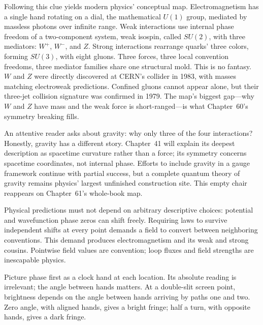 \begin{mainline}
Following this clue yields modern physics' conceptual map. Electromagnetism has a single hand rotating on a dial, the mathematical \(U(1)\) group, mediated by massless photons over infinite range. Weak interactions use internal phase freedom of a two-component system, weak isospin, called \(SU(2)\), with three mediators: \(W^{+}\), \(W^{-}\), and \(Z\). Strong interactions rearrange quarks' three colors, forming \(SU(3)\), with eight gluons. Three forces, three local convention freedoms, three mediator families share one structural mold. This is no fantasy. \(W\) and \(Z\) were directly discovered at CERN's collider in 1983, with masses matching electroweak predictions. Confined gluons cannot appear alone, but their three-jet collision signature was confirmed in 1979. The map's biggest gap---why \(W\) and \(Z\) have mass and the weak force is short-ranged---is what Chapter~60's symmetry breaking fills.

An attentive reader asks about gravity: why only three of the four interactions? Honestly, gravity has a different story. Chapter~41 will explain its deepest description as spacetime curvature rather than a force; its symmetry concerns spacetime coordinates, not internal phase. Efforts to include gravity in a gauge framework continue with partial success, but a complete quantum theory of gravity remains physics' largest unfinished construction site. This empty chair reappears on Chapter~61's whole-book map.
\end{mainline}


\begin{oneline}
Physical predictions must not depend on arbitrary descriptive choices: potential and wavefunction phase zeros can shift freely. Requiring laws to survive independent shifts at every point demands a field to convert between neighboring conventions. This demand produces electromagnetism and its weak and strong cousins. Pointwise field values are convention; loop fluxes and field strengths are inescapable physics.
\end{oneline}


\begin{mainline}
Picture phase first as a clock hand at each location. Its absolute reading is irrelevant; the angle between hands matters. At a double-slit screen point, brightness depends on the angle between hands arriving by paths one and two. Zero angle, with aligned hands, gives a bright fringe; half a turn, with opposite hands, gives a dark fringe.
\end{mainline}

